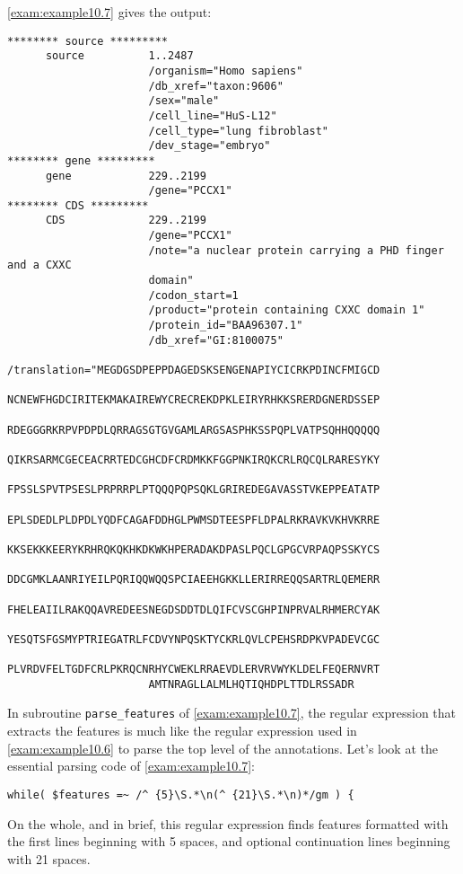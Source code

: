 \autoref{exam:example10.7} gives the output:

\begin{lstlisting}
******** source *********
      source          1..2487
                      /organism="Homo sapiens"
                      /db_xref="taxon:9606"
                      /sex="male"
                      /cell_line="HuS-L12"
                      /cell_type="lung fibroblast"
                      /dev_stage="embryo"
******** gene *********
      gene            229..2199
                      /gene="PCCX1"
******** CDS *********
      CDS             229..2199
                      /gene="PCCX1"
                      /note="a nuclear protein carrying a PHD finger and a CXXC
                      domain"
                      /codon_start=1
                      /product="protein containing CXXC domain 1"
                      /protein_id="BAA96307.1"
                      /db_xref="GI:8100075"
                      /translation="MEGDGSDPEPPDAGEDSKSENGENAPIYCICRKPDINCFMIGCD
                      NCNEWFHGDCIRITEKMAKAIREWYCRECREKDPKLEIRYRHKKSRERDGNERDSSEP
                      RDEGGGRKRPVPDPDLQRRAGSGTGVGAMLARGSASPHKSSPQPLVATPSQHHQQQQQ
                      QIKRSARMCGECEACRRTEDCGHCDFCRDMKKFGGPNKIRQKCRLRQCQLRARESYKY
                      FPSSLSPVTPSESLPRPRRPLPTQQQPQPSQKLGRIREDEGAVASSTVKEPPEATATP
                      EPLSDEDLPLDPDLYQDFCAGAFDDHGLPWMSDTEESPFLDPALRKRAVKVKHVKRRE
                      KKSEKKKEERYKRHRQKQKHKDKWKHPERADAKDPASLPQCLGPGCVRPAQPSSKYCS
                      DDCGMKLAANRIYEILPQRIQQWQQSPCIAEEHGKKLLERIRREQQSARTRLQEMERR
                      FHELEAIILRAKQQAVREDEESNEGDSDDTDLQIFCVSCGHPINPRVALRHMERCYAK
                      YESQTSFGSMYPTRIEGATRLFCDVYNPQSKTYCKRLQVLCPEHSRDPKVPADEVCGC
                      PLVRDVFELTGDFCRLPKRQCNRHYCWEKLRRAEVDLERVRVWYKLDELFEQERNVRT
                      AMTNRAGLLALMLHQTIQHDPLTTDLRSSADR
\end{lstlisting}

In subroutine \verb|parse_features| of \autoref{exam:example10.7}, the regular expression that extracts the features is much like the regular expression used in \autoref{exam:example10.6} to parse the top level of the annotations. Let's look at the essential parsing code of \autoref{exam:example10.7}:

\begin{lstlisting}
while( $features =~ /^ {5}\S.*\n(^ {21}\S.*\n)*/gm ) {
\end{lstlisting}

On the whole, and in brief, this regular expression finds features formatted with the first lines beginning with 5 spaces, and optional continuation lines beginning with 21 spaces.

